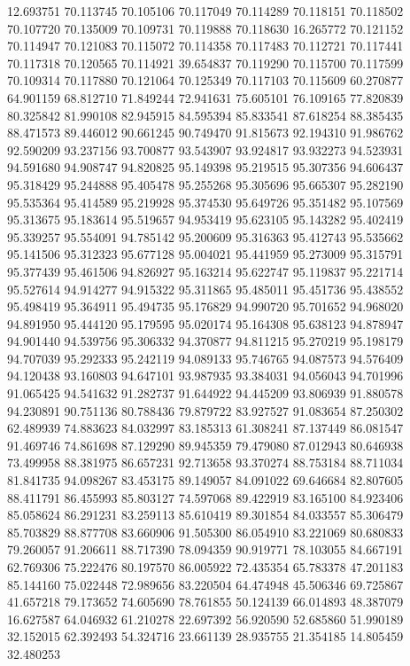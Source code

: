 12.693751
70.113745
70.105106
70.117049
70.114289
70.118151
70.118502
70.107720
70.135009
70.109731
70.119888
70.118630
16.265772
70.121152
70.114947
70.121083
70.115072
70.114358
70.117483
70.112721
70.117441
70.117318
70.120565
70.114921
39.654837
70.119290
70.115700
70.117599
70.109314
70.117880
70.121064
70.125349
70.117103
70.115609
60.270877
64.901159
68.812710
71.849244
72.941631
75.605101
76.109165
77.820839
80.325842
81.990108
82.945915
84.595394
85.833541
87.618254
88.385435
88.471573
89.446012
90.661245
90.749470
91.815673
92.194310
91.986762
92.590209
93.237156
93.700877
93.543907
93.924817
93.932273
94.523931
94.591680
94.908747
94.820825
95.149398
95.219515
95.307356
94.606437
95.318429
95.244888
95.405478
95.255268
95.305696
95.665307
95.282190
95.535364
95.414589
95.219928
95.374530
95.649726
95.351482
95.107569
95.313675
95.183614
95.519657
94.953419
95.623105
95.143282
95.402419
95.339257
95.554091
94.785142
95.200609
95.316363
95.412743
95.535662
95.141506
95.312323
95.677128
95.004021
95.441959
95.273009
95.315791
95.377439
95.461506
94.826927
95.163214
95.622747
95.119837
95.221714
95.527614
94.914277
94.915322
95.311865
95.485011
95.451736
95.438552
95.498419
95.364911
95.494735
95.176829
94.990720
95.701652
94.968020
94.891950
95.444120
95.179595
95.020174
95.164308
95.638123
94.878947
94.901440
94.539756
95.306332
94.370877
94.811215
95.270219
95.198179
94.707039
95.292333
95.242119
94.089133
95.746765
94.087573
94.576409
94.120438
93.160803
94.647101
93.987935
93.384031
94.056043
94.701996
91.065425
94.541632
91.282737
91.644922
94.445209
93.806939
91.880578
94.230891
90.751136
80.788436
79.879722
83.927527
91.083654
87.250302
62.489939
74.883623
84.032997
83.185313
61.308241
87.137449
86.081547
91.469746
74.861698
87.129290
89.945359
79.479080
87.012943
80.646938
73.499958
88.381975
86.657231
92.713658
93.370274
88.753184
88.711034
81.841735
94.098267
83.453175
89.149057
84.091022
69.646684
82.807605
88.411791
86.455993
85.803127
74.597068
89.422919
83.165100
84.923406
85.058624
86.291231
83.259113
85.610419
89.301854
84.033557
85.306479
85.703829
88.877708
83.660906
91.505300
86.054910
83.221069
80.680833
79.260057
91.206611
88.717390
78.094359
90.919771
78.103055
84.667191
62.769306
75.222476
80.197570
86.005922
72.435354
65.783378
47.201183
85.144160
75.022448
72.989656
83.220504
64.474948
45.506346
69.725867
41.657218
79.173652
74.605690
78.761855
50.124139
66.014893
48.387079
16.627587
64.046932
61.210278
22.697392
56.920590
52.685860
51.990189
32.152015
62.392493
54.324716
23.661139
28.935755
21.354185
14.805459
32.480253
